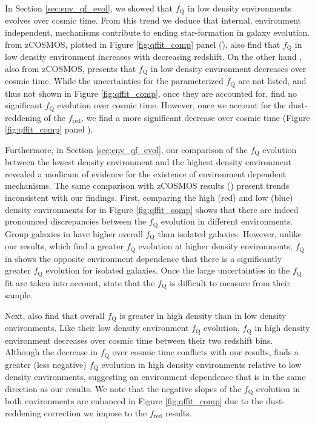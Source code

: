 
In Section \ref{sec:env_qf_evol}, we showed that $f_{\mathrm{Q}}$ in
low density environments evolves over cosmic time. From this trend we
deduce that internal, environment independent, mechanisms contribute
to ending star-formation in galaxy evolution. \cite{Iovino:2010aa}
from zCOSMOS, plotted in Figure \ref{fig:qffit_comp}  panel (\iovinopanel), also find that
$f_{\mathrm{Q}}$ in low density environment increases with decreasing redshift. On the other hand \cite{Kovac:2014aa}, also from zCOSMOS, presents that $f_{\mathrm{Q}}$ in low density environment decreases over cosmic time. While the uncertainties for the parameterized $f_{\mathrm{Q}}$ are not listed, and thus not shown in Figure \ref{fig:qffit_comp}, once they are accounted for, \cite{Kovac:2014aa} find no significant $f_{\mathrm{Q}}$ evolution over cosmic time. However, once we account for the dust-reddening of the $f_{\mathrm{red}}$, we find a more significant decrease over cosmic time (Figure \ref{fig:qffit_comp} panel \kovacpanel).

Furthermore, in Section \ref{sec:env_qf_evol}, our comparison of the
$f_{\mathrm{Q}}$ evolution between the lowest density environment and the
highest density environment revealed a modicum of evidence for the
existence of environment dependent mechanisms. The same comparison
with zCOSMOS results (\citealt{Iovino:2010aa, Kovac:2014aa}) present
trends inconsistent with our findings. First, comparing the high (red)
and low (blue) density environments for \cite{Iovino:2010aa} in Figure
\ref{fig:qffit_comp} shows that there are indeed pronounced
discrepancies between the $f_{\mathrm{Q}}$ evolution in different
environments. Group galaxies in \cite{Iovino:2010aa} have higher
overall $f_{\mathrm{Q}}$ than isolated galaxies. However, unlike our
results, which find a greater $f_{\mathrm{Q}}$ evolution at higher density
environments, $f_\mathrm{Q}$ in \cite{Iovino:2010aa} shows the opposite environment
dependence that there is a significantly greater $f_{\mathrm{Q}}$
evolution for isolated galaxies. Once the large uncertainties in the $f_\mathrm{Q}$ 
fit are taken into account, \cite{Iovino:2010aa} state that the $f_\mathrm{Q}$ is difficult to measure from their sample. 

Next, \cite{Kovac:2014aa} also find that overall $f_{\mathrm{Q}}$ is
greater in high density than in low density environments. Like their
low density environment $f_{\mathrm{Q}}$ evolution, $f_{\mathrm{Q}}$ in high
density environment decreases over cosmic time between their two
redshift bins. Although the decrease in $f_{\mathrm{Q}}$ over cosmic time
conflicts with our results, \cite{Kovac:2014aa} finds a greater (less
negative) $f_{\mathrm{Q}}$ evolution in high density environments relative
to low density environments, suggesting an environment dependence that
is in the same direction as our results. We note that the negative
slopes of the $f_{\mathrm{Q}}$ evolution in both environments are enhanced
in Figure \ref{fig:qffit_comp} due to the dust-reddening
correction we impose to the \cite{Kovac:2014aa} $f_{\mathrm{red}}$ results. 

